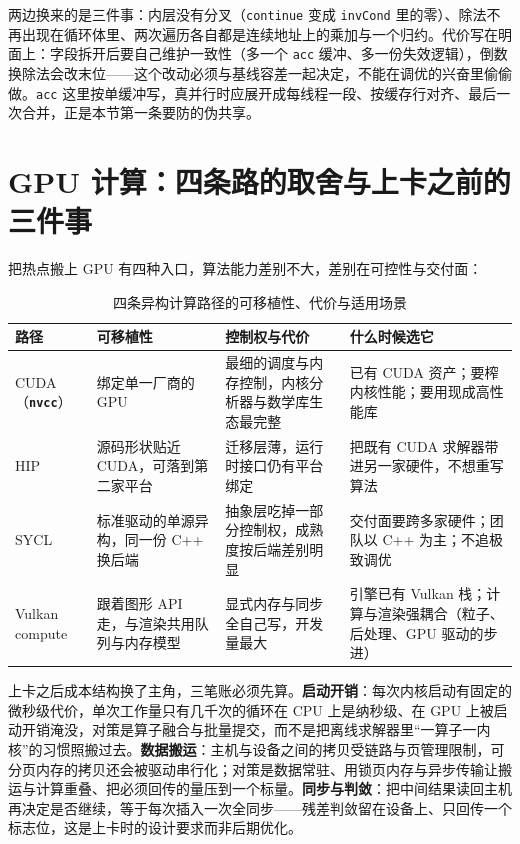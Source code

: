 \documentclass[12pt,a4paper,fontset=fandol]{ctexbook}
\newcommand{\Tp}[1]{\texttt{#1}}
\newcommand{\Lib}[1]{\textbf{\texttt{#1}}}
\newcommand{\Lang}[1]{\textsf{#1}}
\newcommand{\CPP}{\Lang{C++}}
\begin{document}
两边换来的是三件事：内层没有分叉（\Tp{continue} 变成 \Tp{invCond} 里的零）、除法不再出现在循环体里、两次遍历各自都是连续地址上的乘加与一个归约。代价写在明面上：字段拆开后要自己维护一致性（多一个 \Tp{acc} 缓冲、多一份失效逻辑），倒数换除法会改末位——这个改动必须与基线容差一起决定，不能在调优的兴奋里偷偷做。\Tp{acc} 这里按单缓冲写，真并行时应展开成每线程一段、按缓存行对齐、最后一次合并，正是本节第一条要防的伪共享。

\section{GPU 计算：四条路的取舍与上卡之前的三件事}
\label{sec:ch17-gpu}

把热点搬上 GPU 有四种入口，算法能力差别不大，差别在可控性与交付面：

\begin{table}[htbp]
\centering
\caption{四条异构计算路径的可移植性、代价与适用场景}
\label{tab:ch17-gpu-routes}
\begin{tabular}{>{\raggedright\arraybackslash}p{}
                >{\raggedright\arraybackslash}p{}
                >{\raggedright\arraybackslash}p{}
                >{\raggedright\arraybackslash}p{}}
\toprule
\textbf{路径} & \textbf{可移植性} & \textbf{控制权与代价} & \textbf{什么时候选它} \\
\midrule
\Lang{CUDA}（\Lib{nvcc}） & 绑定单一厂商的 GPU & 最细的调度与内存控制，内核分析器与数学库生态最完整 & 已有 \Lang{CUDA} 资产；要榨内核性能；要用现成高性能库 \\
\Lang{HIP} & 源码形状贴近 \Lang{CUDA}，可落到第二家平台 & 迁移层薄，运行时接口仍有平台绑定 & 把既有 \Lang{CUDA} 求解器带进另一家硬件，不想重写算法 \\
\Lang{SYCL} & 标准驱动的单源异构，同一份 \CPP{} 换后端 & 抽象层吃掉一部分控制权，成熟度按后端差别明显 & 交付面要跨多家硬件；团队以 \CPP{} 为主；不追极致调优 \\
\Lang{Vulkan compute} & 跟着图形 API 走，与渲染共用队列与内存模型 & 显式内存与同步全自己写，开发量最大 & 引擎已有 \Lang{Vulkan} 栈；计算与渲染强耦合（粒子、后处理、GPU 驱动的步进） \\
\bottomrule
\end{tabular}
\end{table}

上卡之后成本结构换了主角，三笔账必须先算。\textbf{启动开销}：每次内核启动有固定的微秒级代价，单次工作量只有几千次的循环在 CPU 上是纳秒级、在 GPU 上被启动开销淹没，对策是算子融合与批量提交，而不是把离线求解器里``一算子一内核''的习惯照搬过去。\textbf{数据搬运}：主机与设备之间的拷贝受链路与页管理限制，可分页内存的拷贝还会被驱动串行化；对策是数据常驻、用锁页内存与异步传输让搬运与计算重叠、把必须回传的量压到一个标量。\textbf{同步与判敛}：把中间结果读回主机再决定是否继续，等于每次插入一次全同步——残差判敛留在设备上、只回传一个标志位，这是上卡时的设计要求而非后期优化。
\end{document}
